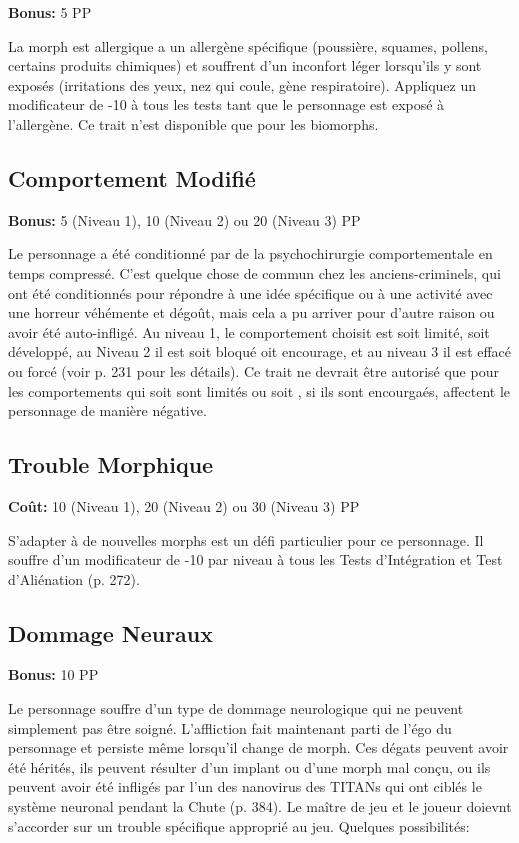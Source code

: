 \textbf{Bonus:} 5 PP 

La morph est allergique a un allergène spécifique (poussière, squames, pollens, certains produits chimiques) et souffrent d'un inconfort léger lorsqu'ils y sont exposés (irritations des yeux, nez qui coule, gène respiratoire). Appliquez un modificateur de -10 à tous les tests tant que le personnage est exposé à l'allergène. Ce trait n'est disponible que pour les biomorphs. 

\subsection{Comportement Modifié} \label{sec:traits-modified-behaviour} 

\textbf{Bonus:} 5 (Niveau 1), 10 (Niveau 2) ou 20 (Niveau 3) PP 

Le personnage a été conditionné par de la psychochirurgie comportementale en temps compressé. C'est quelque chose de commun chez les anciens-criminels, qui ont été conditionnés pour répondre à une idée spécifique ou à une activité avec une horreur véhémente et dégoût, mais cela a pu arriver pour d'autre raison ou avoir été auto-infligé. Au niveau 1, le comportement choisit est soit limité, soit développé, au Niveau 2 il est soit bloqué oit encourage, et au niveau 3 il est effacé ou forcé (voir p. 231 pour les détails). Ce trait ne devrait être autorisé que pour les comportements qui soit sont limités ou soit , si ils sont encourgaés, affectent le personnage de manière négative. 

\subsection{Trouble Morphique} \label{sec:traits-morphing-disorder} 

\textbf{Coût:} 10 (Niveau 1), 20 (Niveau 2) ou 30 (Niveau 3) PP 

S'adapter à de nouvelles morphs est un défi particulier pour ce personnage. Il souffre d'un modificateur de -10 par niveau à tous les Tests d'Intégration et Test d'Aliénation (p. 272). 

\subsection{Dommage Neuraux} \label{sec:traits-neural-damage} 

\textbf{Bonus:} 10 PP 

Le personnage souffre d'un type de dommage neurologique qui ne peuvent simplement pas être soigné. L'affliction fait maintenant parti de l'égo du personnage et persiste même lorsqu'il change de morph. Ces dégats peuvent avoir été hérités, ils peuvent résulter d'un implant ou d'une morph mal conçu, ou ils peuvent avoir été infligés par l'un des nanovirus des TITANs qui ont ciblés le système neuronal pendant la Chute (p. 384). Le maître de jeu et le joueur doievnt s'accorder sur un trouble spécifique approprié au jeu. Quelques possibilités: 

